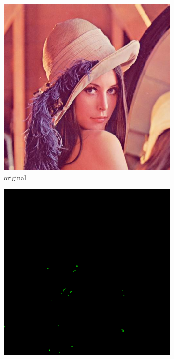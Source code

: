 \documentclass[12pt]{article}
\begin{document}
\begin{figure}[H]\centering
    \hfill
    \begin{subfigure}[t]{\subfiguresize}
        \includegraphics[width=\textwidth]{lenac.png}
        \caption{original}
    \end{subfigure}
    \hfill
    \begin{subfigure}[t]{\subfiguresize}
        \includegraphics[width=\textwidth]{lena_uolis_clear.png}

\end{subfigure}
\end{figure}
\end{document}
